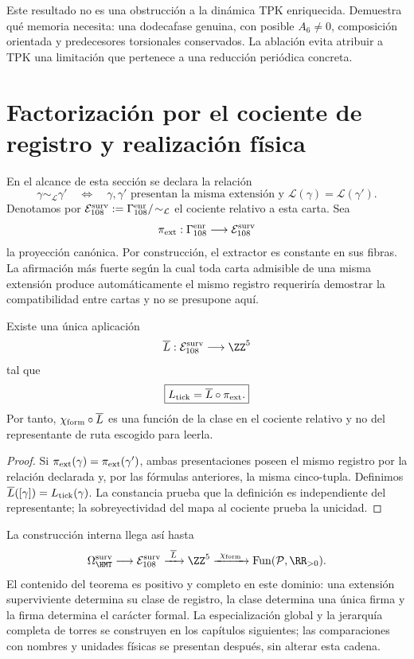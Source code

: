 Este resultado no es una obstrucción a la dinámica TPK enriquecida. Demuestra
qué memoria necesita: una dodecafase genuina, con posible
\(A_6\ne0\), composición orientada y predecesores torsionales conservados. La
ablación evita atribuir a TPK una limitación que pertenece a una reducción
periódica concreta.

\section{Factorización por el cociente de registro y realización física}

En el alcance de esta sección se declara la relación
\[
\gamma\sim_{\mathcal L}\gamma'
\quad\Longleftrightarrow\quad
\text{\(\gamma,\gamma'\) presentan la misma extensión y }
\mathcal L(\gamma)=\mathcal L(\gamma').
\]
Denotamos por
\(\mathcal E_{108}^{\rm surv}:=
\Gamma_{108}^{\rm enr}/\!\sim_{\mathcal L}\)
el cociente relativo a esta carta. Sea
\[
 \pi_{\rm ext}:\Gamma_{108}^{\rm enr}\longrightarrow
 \mathcal E_{108}^{\rm surv}
\]
la proyección canónica. Por construcción, el extractor es constante en sus
fibras. La afirmación más fuerte según la cual toda carta admisible de una
misma extensión produce automáticamente el mismo registro requeriría demostrar
la compatibilidad entre cartas y no se presupone aquí.

\begin{theorem}
\label{thm:descenso-caracter-extension}
Existe una única aplicación
\[
 \overline L:\mathcal E_{108}^{\rm surv}\longrightarrow\ZZ^5
\]
tal que
\[
 \boxed{L_{\rm tick}=\overline L\circ\pi_{\rm ext}.}
\]
Por tanto, \(\chi_{\rm form}\circ\overline L\) es una función de la clase en
el cociente relativo y no del representante de ruta escogido para leerla.
\end{theorem}

\begin{proof}
Si \(\pi_{\rm ext}(\gamma)=\pi_{\rm ext}(\gamma')\), ambas presentaciones
poseen el mismo registro por la relación declarada y, por las fórmulas
anteriores, la misma cinco-tupla. Definimos
\(\overline L([\gamma])=L_{\rm tick}(\gamma)\). La constancia prueba que la
definición es independiente del representante; la sobreyectividad del mapa
al cociente prueba la unicidad.
\end{proof}

La construcción interna llega así hasta
\[
 \Omega_{\HMT}^{\rm surv}
 \longrightarrow\mathcal E_{108}^{\rm surv}
 \xrightarrow{\ \overline L\ }\ZZ^5
 \xrightarrow{\ \chi_{\rm form}\ }
 \operatorname{Fun}(\mathcal P,\RR_{>0}).
\]
El contenido del teorema es positivo y completo en este dominio: una
extensión superviviente determina su clase de registro, la clase determina
una única firma y la firma determina el carácter formal. La especialización
global y la jerarquía completa de torres se construyen en los capítulos
siguientes; las
comparaciones con nombres y unidades físicas se presentan después, sin
alterar esta cadena.
